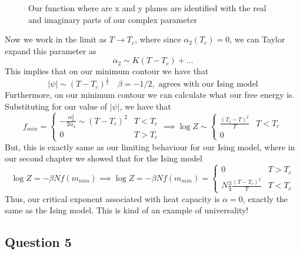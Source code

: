 \documentclass[11pt, oneside]{article}   	%
\begin{document}
\begin{figure}[h] 
\centering
{}
\caption{Our function where are x and y planes are identified with the real and imaginary parts of our complex parameter}
\end{figure} 

Now we work in the limit as $T \rightarrow T_c$, where since $\alpha_2( T_c) = 0$, we can Taylor expand this parameter as 
\[ 
	\alpha_2 \sim K ( T - T_c ) + \dots 
\] This implies that on our minimum contour we have that 
\[ 
	|\psi| \sim (T - T_c )^\frac{ 1 }{ 2 } \quad \beta = - 1 / 2, \text{ agrees with our Ising model} 
\] Furthermore, on our minimum contour we can calculate what our free energy is. Substituting for our value of $|\psi|$, we have that 
\[ 	
	f_{min} =  \begin{cases} 
		 - \frac{ \alpha_2^2 } { 2 \alpha_4 } \sim ( T - T_c)^2  & T < T_c \\
		 0 & T > T_c
		\end{cases} 
		\implies \log Z \sim \begin{cases} 
			\frac{ (T_c - T)^2 }{ T } & T < T_c \\
			0 
		\end{cases} 
\] But, this is exactly same as our limiting behaviour for our Ising model, where in our second chapter we showed that for the Ising model
\[ 
	\log Z = - \beta N f(m_{min} ) \implies \log Z =  - \beta N f(m_{min}) = \begin{cases} 
	0 & T > T_c \\
 N \frac{ 3}{ 4} \frac{ ( T - T_c)^2 }{ T}  & T < T_c 
\end{cases} 
\]  Thus, our critical exponent associated with heat capacity is $\alpha = 0$, exactly the same as the Ising model. This is kind of an example of universality! 

\pagebreak 
\subsection{Question 5} 
\end{document}
